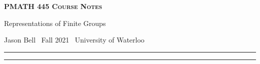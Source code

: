 \documentclass[10pt]{article}
\numberwithin{equation}{section}
\newcommand{\newtitle}[4]{
  \begin{center}
	\huge{\textbf{\textsc{#1 Course Notes}}}
    
	\large{\sc #2}
    
	{\sc #3 \textbullet\, #4 \textbullet\, University of Waterloo}
	\normalsize\vspace{1cm}\hrule
  \end{center}
}
\theoremstyle{newstyle}
\begin{document}
\pagestyle{fancy}
\newtitle{PMATH 445}{Representations of Finite Groups}{Jason Bell}{Fall 2021}

\tableofcontents
\vspace{1cm}\hrule
\fancyhead[R]{\nouppercase\rightmark}
\newpage 
{}



 



\end{document}
